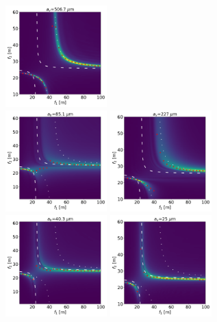 \documentclass{osa-article}
\begin{document}
\begin{figure}[htbp]
\includegraphics[width=0.35\textwidth]{V_2.png}\\
\includegraphics[width=0.35\textwidth]{H_1.png}
\includegraphics[width=0.35\textwidth]{V_1.png}\\
\includegraphics[width=0.35\textwidth]{H_0.png}
\includegraphics[width=0.35\textwidth]{V_0.png}

\end{figure}
\end{document}
